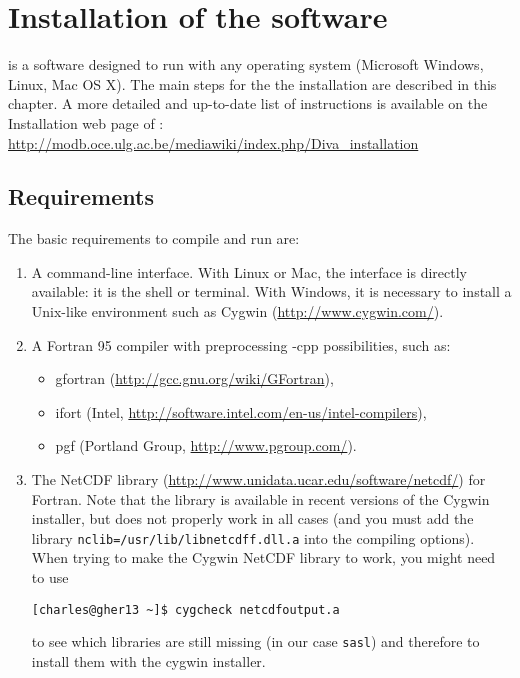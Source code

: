 \chapter{Installation of the software}

\diva is a software designed to run with any operating system (Microsoft Windows, Linux, Mac OS X). The main steps for the the installation are described in this chapter. A more detailed and up-to-date list of instructions is available on the Installation web page of \diva: \url{http://modb.oce.ulg.ac.be/mediawiki/index.php/Diva_installation}


\minitoc




\section{Requirements}

The basic requirements to compile and run \diva are:
\begin{enumerate}
\item A command-line interface. With Linux or Mac, the interface is directly available: it is the shell or terminal. With Windows, it is necessary to install a Unix-like environment such as Cygwin (\url{http://www.cygwin.com/}).
\item A Fortran 95 compiler with preprocessing -cpp possibilities, such as:
\begin{itemize}
\item gfortran (\url{http://gcc.gnu.org/wiki/GFortran}),
\item ifort (Intel\textsuperscript{\textregistered}, \url{http://software.intel.com/en-us/intel-compilers}),
\item pgf (Portland Group, \url{http://www.pgroup.com/}).
\end{itemize}    
\item The NetCDF library (\url{http://www.unidata.ucar.edu/software/netcdf/}) for Fortran. Note that the library is available in recent versions of the Cygwin installer, but does not properly work in all cases (and you must add the library \texttt{nclib=/usr/lib/libnetcdff.dll.a} into the compiling options). When trying to make the Cygwin NetCDF library to work, you might need to use 

\begin{lstlisting}[style=Bash]
[charles@gher13 ~]$ cygcheck netcdfoutput.a
\end{lstlisting}
to see which libraries are still missing (in our case \texttt{sasl}) and therefore to install them with the cygwin installer.  
\end{enumerate}

